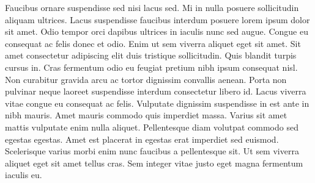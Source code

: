 Faucibus ornare suspendisse sed nisi lacus sed. Mi in nulla posuere sollicitudin aliquam ultrices. Lacus suspendisse faucibus interdum posuere lorem ipsum dolor sit amet. Odio tempor orci dapibus ultrices in iaculis nunc sed augue. Congue eu consequat ac felis donec et odio. Enim ut sem viverra aliquet eget sit amet. Sit amet consectetur adipiscing elit duis tristique sollicitudin. Quis blandit turpis cursus in. Cras fermentum odio eu feugiat pretium nibh ipsum consequat nisl. Non curabitur gravida arcu ac tortor dignissim convallis aenean. Porta non pulvinar neque laoreet suspendisse interdum consectetur libero id. Lacus viverra vitae congue eu consequat ac felis. Vulputate dignissim suspendisse in est ante in nibh mauris. Amet mauris commodo quis imperdiet massa. Varius sit amet mattis vulputate enim nulla aliquet. Pellentesque diam volutpat commodo sed egestas egestas. Amet est placerat in egestas erat imperdiet sed euismod. Scelerisque varius morbi enim nunc faucibus a pellentesque sit. Ut sem viverra aliquet eget sit amet tellus cras. Sem integer vitae justo eget magna fermentum iaculis eu.